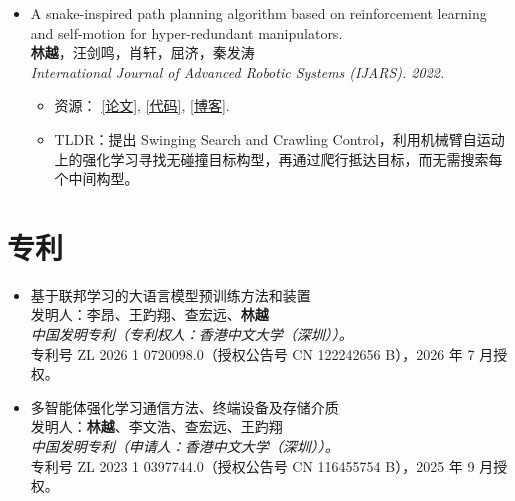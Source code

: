\documentclass[a4paper,20pt]{article}
\begin{document}
\begin{itemize}[leftmargin=*,itemsep=0pt,topsep=0pt,partopsep=0pt]
\begin{itemize}[itemsep=0pt,topsep=0pt,partopsep=0pt]
              \item 在西安会场进行了演讲。
              \item 资源：
                    \href{https://ieeexplore.ieee.org/abstract/document/9561060}{[论文]},
                    \href{https://yuelin301.github.io/posts/RHex-T3/}{[博客]}.
              \item TLDR：提出具有两个自由度的可变形 RHex 设计，可在轮、腿、爪和钩等模式间切换，用于高效移动、越障、搬运物体和攀爬梯子。
          \end{itemize}
    \item A snake-inspired path planning algorithm based on reinforcement learning and self-motion for hyper-redundant manipulators. \\
          \textbf{林越}，汪剑鸣，肖轩，屈济，秦发涛 \\
          \textit{International Journal of Advanced Robotic Systems (IJARS). 2022.}
          \begin{itemize}[itemsep=0pt,topsep=0pt,partopsep=0pt]
              \item 资源：
                    \href{https://journals.sagepub.com/doi/full/10.1177/17298806221110022}{[论文]},
                    \href{https://github.com/YueLin301/Swinging-Search-Crawling-Control}{[代码]},
                    \href{https://yuelin301.github.io/posts/SSCC/}{[博客]}.
              \item TLDR：提出 Swinging Search and Crawling Control，利用机械臂自运动上的强化学习寻找无碰撞目标构型，再通过爬行抵达目标，而无需搜索每个中间构型。
          \end{itemize}
\end{itemize}

\vspace{5pt}
\section{专利}
\vspace{3pt}

\begin{itemize}[leftmargin=*, itemsep=0pt, topsep=0pt, partopsep=0pt]
    \item 基于联邦学习的大语言模型预训练方法和装置 \\
          发明人：李昂、王趵翔、查宏远、\textbf{林越} \\
          \textit{中国发明专利（专利权人：香港中文大学（深圳））。} \\
          专利号 ZL 2026 1 0720098.0（授权公告号 CN 122242656 B），2026 年 7 月授权。

    \item 多智能体强化学习通信方法、终端设备及存储介质 \\
          发明人：\textbf{林越}、李文浩、查宏远、王趵翔 \\
          \textit{中国发明专利（申请人：香港中文大学（深圳））。} \\
          专利号 ZL 2023 1 0397744.0（授权公告号 CN 116455754 B），2025 年 9 月授权。
\end{itemize}
\end{document}
